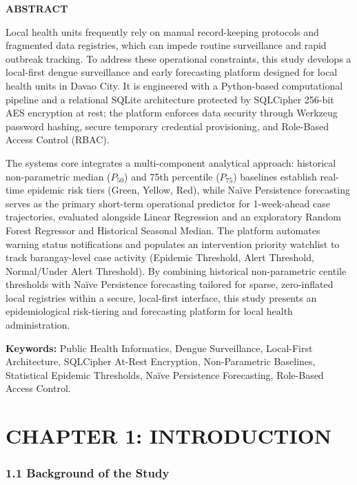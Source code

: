 \documentclass[
]{article}
\begin{document}
\textbf{ABSTRACT}

Local health units frequently rely on manual record-keeping protocols
and fragmented data registries, which can impede routine surveillance
and rapid outbreak tracking. To address these operational constraints,
this study develops a local-first dengue surveillance and early
forecasting platform designed for local health units in Davao City. It
is engineered with a Python-based computational pipeline and a
relational SQLite architecture protected by SQLCipher 256-bit AES
encryption at rest; the platform enforces data security through Werkzeug
password hashing, secure temporary credential provisioning, and
Role-Based Access Control (RBAC).

The system\textquotesingle s core integrates a multi-component
analytical approach: historical non-parametric median (\(P_{50}\)) and
75th percentile (\(P_{75}\)) baselines establish real-time epidemic risk
tiers (Green, Yellow, Red), while Naïve Persistence forecasting serves
as the primary short-term operational predictor for 1-week-ahead case
trajectories, evaluated alongside Linear Regression and an exploratory
Random Forest Regressor and Historical Seasonal Median. The platform
automates warning status notifications and populates an intervention
priority watchlist to track barangay-level case activity (Epidemic
Threshold, Alert Threshold, Normal/Under Alert Threshold). By combining
historical non-parametric centile thresholds with Naïve Persistence
forecasting tailored for sparse, zero-inflated local registries within a
secure, local-first interface, this study presents an epidemiological
risk-tiering and forecasting platform for local health administration.

\textbf{Keywords:} Public Health Informatics, Dengue Surveillance,
Local-First Architecture, SQLCipher At-Rest Encryption, Non-Parametric
Baselines, Statistical Epidemic Thresholds, Naïve Persistence
Forecasting, Role-Based Access Control.

\section{\texorpdfstring{\textbf{CHAPTER 1:
INTRODUCTION}}{CHAPTER 1: INTRODUCTION}}\label{chapter-1-introduction}

\subsubsection{\texorpdfstring{\textbf{1.1 Background of the
Study}}{1.1 Background of the Study}}\label{background-of-the-study}
\end{document}

